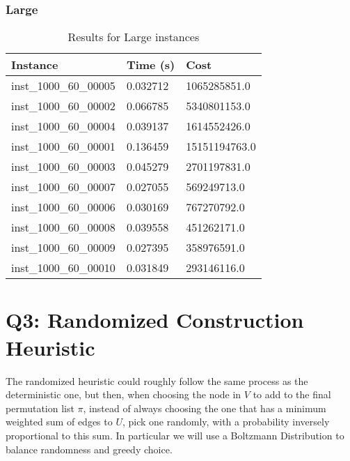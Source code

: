 \documentclass{article}
\begin{document}
\subsubsection*{Large}
\begin{table}[H]
\centering
\begin{tabular}{|l|l|l|}
\hline
\textbf{Instance}         & \textbf{Time (s)} & \textbf{Cost} \\ \hline
inst\_1000\_60\_00005 & 0.032712 & 1065285851.0  \\ \hline
inst\_1000\_60\_00002 & 0.066785 & 5340801153.0  \\ \hline
inst\_1000\_60\_00004 & 0.039137 & 1614552426.0  \\ \hline
inst\_1000\_60\_00001 & 0.136459 & 15151194763.0 \\ \hline
inst\_1000\_60\_00003 & 0.045279 & 2701197831.0  \\ \hline
inst\_1000\_60\_00007 & 0.027055 & 569249713.0   \\ \hline
inst\_1000\_60\_00006 & 0.030169 & 767270792.0   \\ \hline
inst\_1000\_60\_00008 & 0.039558 & 451262171.0   \\ \hline
inst\_1000\_60\_00009 & 0.027395 & 358976591.0   \\ \hline
inst\_1000\_60\_00010 & 0.031849 & 293146116.0   \\ \hline
\end{tabular}
\caption{Results for Large instances}
\end{table}



\section*{Q3: Randomized Construction Heuristic}
The randomized heuristic could roughly follow the same process as the deterministic one, but then, when choosing the node in $V$ to add to the final permutation list $\pi$, instead of always choosing the one that has a minimum weighted sum of edges to $U$, pick one randomly, with a probability inversely proportional to this sum.
In particular we will use a Boltzmann Distribution to balance randomness and greedy choice. 
\end{document}
